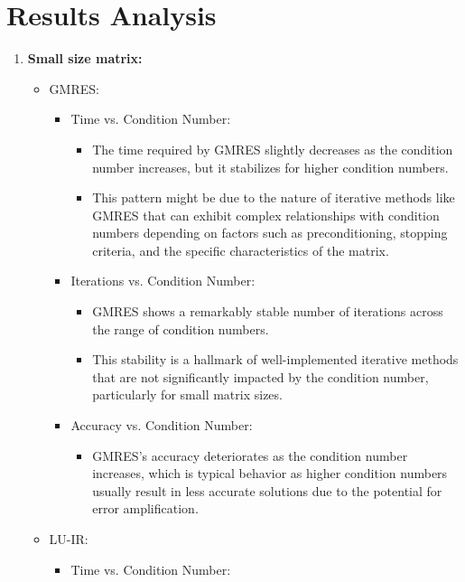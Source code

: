 \section{Results Analysis}
\begin{enumerate}
    \item \textbf{Small size matrix: }
    \begin{itemize}
        \item GMRES:
        \begin{itemize}
            \item Time vs. Condition Number:
            \begin{itemize}
                \item     The time required by GMRES slightly decreases as the condition number increases, but it stabilizes for higher condition numbers.
                \item This pattern might be due to the nature of iterative methods like GMRES that can exhibit complex relationships with condition numbers depending on factors such as preconditioning, stopping criteria, and the specific characteristics of the matrix.
            \end{itemize}
           \item Iterations vs. Condition Number:
           \begin{itemize}
               \item     GMRES shows a remarkably stable number of iterations across the range of condition numbers.
               \item This stability is a hallmark of well-implemented iterative methods that are not significantly impacted by the condition number, particularly for small matrix sizes.
           \end{itemize}
           \item Accuracy vs. Condition Number:
           \begin{itemize}
               \item GMRES's accuracy deteriorates as the condition number increases, which is typical behavior as higher condition numbers usually result in less accurate solutions due to the potential for error amplification.
           \end{itemize}   
        \end{itemize}
        \item LU-IR:
        \begin{itemize}
            \item Time vs. Condition Number:

\end{itemize}
\end{itemize}
\end{enumerate}
